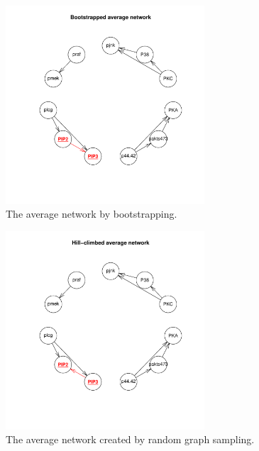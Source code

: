 \documentclass[a4paper,english]{article}
\begin{document}
\begin{figure}[htp]
    \begin{center}
        \includegraphics[width=0.66\textwidth]{boot.pdf}
        \caption{The average network by bootstrapping.}
        \label{fig:boot}
    \end{center}
\end{figure}

\begin{figure}[htp]
    \begin{center}
        \includegraphics[width=0.66\textwidth]{start.pdf}
        \caption{The average network created by random graph sampling.}
        \label{fig:start}
    \end{center}
\end{figure}
\end{document}

